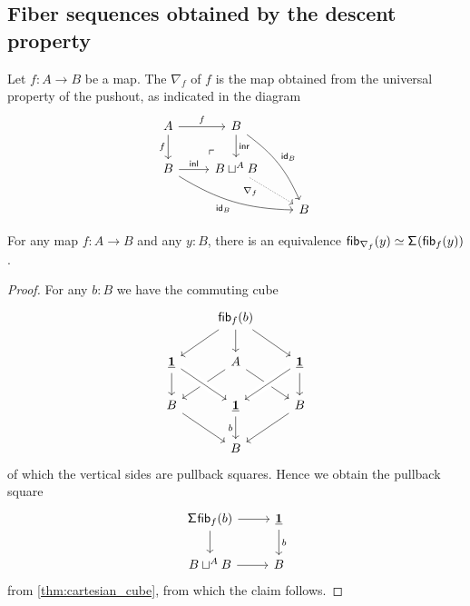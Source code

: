 \subsection{Fiber sequences obtained by the descent property}

\begin{defn}
Let $f:A\to B$ be a map. The  $\nabla_f$ of $f$ is the map obtained from the universal property of the pushout, as indicated in the diagram
\begin{equation*}
\begin{tikzcd}
A \arrow[d,swap,"f"] \arrow[r,"f"] \arrow[dr, phantom, "\ulcorner", very near end] & B \arrow[d,"\inr"] \arrow[ddr,bend left=15,"{\idfunc[B]}"] \\
B \arrow[r,"\inl"] \arrow[drr,bend right=15,swap,"{\idfunc[B]}"] & B\sqcup^{A} B \arrow[dr,densely dotted,near start,swap,"\nabla_f"] \\
& & B
\end{tikzcd}
\end{equation*}
\end{defn}

\begin{prp}
For any map $f:A\to B$ and any $y:B$, there is an equivalence $\eqv{\fib{\nabla_f}{y}}{\susp(\fib{f}{y})}$. 
\end{prp}

\begin{proof}
For any $b:B$ we have the commuting cube 
\begin{equation*}
\begin{tikzcd}
& \fib{f}{b} \arrow[dl] \arrow[d] \arrow[dr] \\
\unit \arrow[d] & A \arrow[dl] \arrow[dr] & \unit \arrow[dl,crossing over] \arrow[d] \\
B \arrow[dr] & \unit \arrow[from=ul,crossing over] \arrow[d,swap,"b"] & B \arrow[dl] \\
& B
\end{tikzcd}
\end{equation*}
of which the vertical sides are pullback squares. Hence we obtain the pullback square
\begin{equation*}
\begin{tikzcd}
\susp{\fib{f}{b}} \arrow[r] \arrow[d] & \unit \arrow[d,"b"] \\
B\sqcup^{A} B \arrow[r] & B
\end{tikzcd}
\end{equation*}
from \cref{thm:cartesian_cube}, from which the claim follows.
\end{proof}

